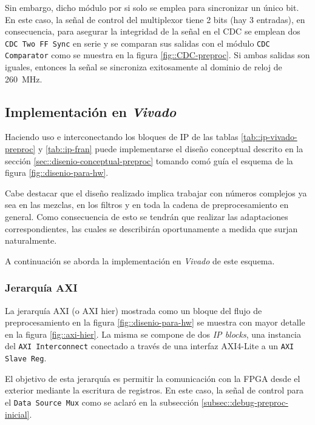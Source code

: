 \documentclass[../../main.tex]{subfiles}
\begin{document}
Sin embargo, dicho módulo por si solo se emplea para sincronizar un único bit. En este caso, la señal de control del multiplexor tiene 2 bits (hay 3 entradas), en consecuencia, para asegurar la integridad de la señal en el CDC se emplean dos \texttt{CDC Two FF Sync} en serie y se comparan sus salidas con el módulo \texttt{CDC Comparator} como se muestra en la figura \ref{fig::CDC-preproc}. Si ambas salidas son iguales, entonces la señal se sincroniza exitosamente al dominio de reloj de 260~MHz.


\subsection{Implementación en \textit{Vivado}}\label{subsec::implementacion-vivado}
Haciendo uso e interconectando los bloques de IP de las tablas \ref{tab::ip-vivado-preproc} y \ref{tab::ip-fran} puede implementarse el diseño conceptual descrito en la sección \ref{sec::disenio-conceptual-preproc} tomando comó guía el esquema de la figura \ref{fig::disenio-para-hw}. 

Cabe destacar que el diseño realizado implica trabajar con números complejos ya sea en las mezclas, en los filtros y en toda la cadena de preprocesamiento en general. Como consecuencia de esto se tendrán que realizar las adaptaciones correspondientes, las cuales se describirán oportunamente a medida que surjan naturalmente.

A continuación se aborda la implementación en \textit{Vivado} de este esquema.

\subsubsection{Jerarquía AXI}
La jerarquía AXI (o AXI hier) mostrada como un bloque del flujo de preprocesamiento en la figura \ref{fig::disenio-para-hw} se muestra con mayor detalle en la figura \ref{fig::axi-hier}. La misma se compone de dos \textit{IP blocks}, una instancia del \texttt{AXI Interconnect} conectado a través de una interfaz AXI4-Lite a un \texttt{AXI Slave Reg}. 

El objetivo de esta jerarquía es permitir la comunicación con la FPGA desde el exterior mediante la escritura de registros. En este caso, la señal de control para el \texttt{Data Source Mux} como se aclaró en la subsección \ref{subsec::debug-preproc-inicial}.
\end{document}

